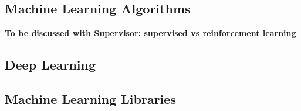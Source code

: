 
\subsection{Machine Learning Algorithms}
\label{subsec:ml-algorithms}

\faEdit\quad \textbf{To be discussed with Supervisor: supervised vs reinforcement learning} \\

\textcolor{dimgray}{\lipsum[1-4]}


\subsection{Deep Learning}
\label{subsec:deep-learning}

\textcolor{dimgray}{\lipsum[1-3]}


\subsection{Machine Learning Libraries}
\label{subsec:ml-libraries}

\textcolor{dimgray}{\lipsum[1]}